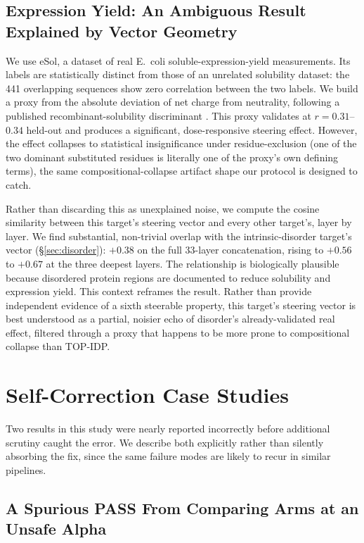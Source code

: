 \documentclass{article}
\begin{document}
\subsection{Expression Yield: An Ambiguous Result Explained by
  Vector Geometry}
\label{sec:expression}

We use eSol, a dataset of real E.\ coli soluble-expression-yield
measurements. Its labels are statistically distinct from those of an
unrelated solubility dataset: the 441 overlapping sequences show zero
correlation between the two labels. We build a proxy from the absolute
deviation of net charge from neutrality, following a published
recombinant-solubility discriminant \citep{wilkinson1991solubility}. This
proxy validates at $r=0.31$--$0.34$ held-out and produces a significant,
dose-responsive steering effect. However, the effect collapses to statistical
insignificance under residue-exclusion (one of the two dominant
substituted residues is literally one of the proxy's own defining
terms), the same compositional-collapse artifact shape our protocol is
designed to catch.

Rather than discarding this as unexplained noise, we compute the cosine
similarity between this target's steering vector and every other
target's, layer by layer. We find substantial, non-trivial overlap with
the intrinsic-disorder target's vector (\S\ref{sec:disorder}): $+0.38$
on the full 33-layer concatenation, rising to $+0.56$ to $+0.67$ at the
three deepest layers. The relationship is biologically plausible because
disordered protein regions are documented to reduce solubility and
expression yield. This context reframes the result. Rather than provide
independent evidence of a sixth steerable property, this target's
steering vector is best understood as a partial, noisier echo of
disorder's already-validated real effect, filtered through a proxy that
happens to be more prone to compositional collapse than TOP-IDP.

\section{Self-Correction Case Studies}

Two results in this study were nearly reported incorrectly before
additional scrutiny caught the error. We describe both explicitly rather
than silently absorbing the fix, since the same failure modes are likely
to recur in similar pipelines.

\subsection{A Spurious PASS From Comparing Arms at an Unsafe Alpha}
\label{sec:l52}
\end{document}

